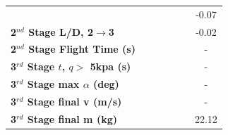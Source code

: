 \begin{table}[ht]
\begin{tabular}{l c c c c c c}
		& \secondthirdSeparationqmThreeNinety
		& \secondthirdSeparationqmThreeNinetyFive
		& \secondthirdSeparationqmThreeStandard
		& \secondthirdSeparationqmThreeOneHundredFive
		& \secondthirdSeparationqmThreeOneHundredTen
		&-0.07
		\\
		\textbf{2$^{nd}$ Stage L/D, 2$\rightarrow$3}
		& \secondthirdSeparationLDmThreeNinety
		& \secondthirdSeparationLDmThreeNinetyFive
		& \secondthirdSeparationLDmThreeStandard
		& \secondthirdSeparationLDmThreeOneHundredFive
		& \secondthirdSeparationLDmThreeOneHundredTen
		&-0.02
		\\
		\textbf{2$^{nd}$ Stage Flight Time (s)}
		& \secondFlightTimemThreeNinety
		& \secondFlightTimemThreeNinetyFive
		& \secondFlightTimemThreeStandard
		& \secondFlightTimemThreeOneHundredFive
		& \secondFlightTimemThreeOneHundredTen
		& -
		\\
		\textbf{3$^{rd}$ Stage $t$, $q >$ 5kpa (s)}
		& \thirdqOverFivemThreeNinety
		& \thirdqOverFivemThreeNinetyFive
		& \thirdqOverFivemThreeStandard
		& \thirdqOverFivemThreeOneHundredFive
		& \thirdqOverFivemThreeOneHundredTen
		& -
		\\
		\textbf{3$^{rd}$ Stage max $\alpha$ (deg)}
		& \thirdmaxAoAmThreeNinety
		& \thirdmaxAoAmThreeNinetyFive
		& \thirdmaxAoAmThreeStandard
		& \thirdmaxAoAmThreeOneHundredFive
		& \thirdmaxAoAmThreeOneHundredTen
		& -
		\\
		\textbf{3$^{rd}$ Stage final v (m/s)}
		& \thirdcircvmThreeNinety
		& \thirdcircvmThreeNinetyFive
		& \thirdcircvmThreeStandard
		& \thirdcircvmThreeOneHundredFive
		& \thirdcircvmThreeOneHundredTen
		& -
		\\
		\textbf{3$^{rd}$ Stage final m (kg)}
		& \thirdcircmmThreeNinety
		& \thirdcircmmThreeNinetyFive
		& \thirdcircmmThreeStandard
		& \thirdcircmmThreeOneHundredFive
		& \thirdcircmmThreeOneHundredTen
		&22.12
		\\
		\hline 
	\end{tabular} 
\end{table}



